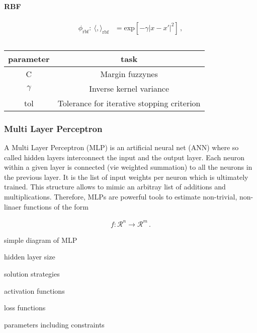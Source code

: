 \paragraph{RBF}
%
\begin{ceqn}
  \begin{align}
    \phi_\text{rbf}:~\langle,\rangle_\text{rbf} &=\text{exp}\left[ -\gamma \left| x-x' \right|^2\right]\,,
  \end{align}
\end{ceqn}
%
%
\begin{table}[h!]
  \centering
  \begin{tabular}{c|c}
    parameter & task \\
    \hline\hline
    C         & Margin fuzzynes \\
    $\gamma$  & Inverse kernel variance \\
    tol       & Tolerance for iterative stopping criterion \\
    \hline
  \end{tabular}
  \caption{}
  \label{tab:rbf_parametrs}
\end{table}
%

\subsubsection{Multi Layer Perceptron}
A Multi Layer Perceptron (MLP) is an artificial neural net (ANN) where
so called hidden layers interconnect the input and the output
layer. Each neuron within a given layer is connected (vie weighted
summation) to all the neurons in the previous layer. It is the list of
input weights per neuron which is ultimately trained. This structure
allows to mimic an arbitray list of additions and
multiplications. Therefore, MLPs are powerful tools to estimate
non-trivial, non-linaer functions of the form
%
\begin{ceqn}
  \begin{align}
    f: \mathcal{R}^n \rightarrow \mathcal{R}^m\,.
  \end{align}
\end{ceqn}
%

simple diagram of MLP

hidden layer size

solution strategies

activation functions

loss functions

parameters including constraints




